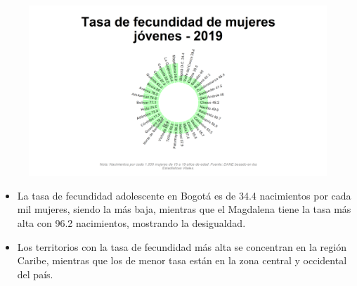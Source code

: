     \begin{figure}[H]
        \caption[Tasa de fecundidad en mujeres jóvenes por departamentos para 2019 ]{\label{fecundjov_dpto_static} }
        \begin{center}
        \includegraphics[width=\textwidth,keepaspectratio]{img/var_282_static.png}
        \end{center}
    \end{figure}
            \begin{itemize}
                \item La tasa de fecundidad adolescente en Bogotá es de 34.4 nacimientos por cada mil mujeres, siendo la más baja, mientras que el Magdalena tiene la tasa más alta con 96.2 nacimientos, mostrando la desigualdad.
                \item Los territorios con la tasa de fecundidad más alta se concentran en la región Caribe, mientras que los de menor tasa están en la zona central y occidental del país.
                \end{itemize}

